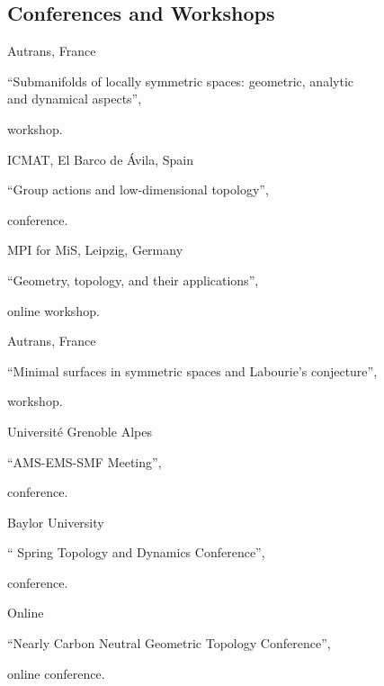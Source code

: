 
\subsection{Conferences and Workshops}

{Autrans, France}
{``Submanifolds of locally symmetric spaces: geometric, analytic \\and dynamical aspects'', \begin{footnotesize}
		workshop.
\end{footnotesize}}
{}


{ICMAT, El Barco de {\'A}vila, Spain}
{``Group actions and low-dimensional topology'', \begin{footnotesize}
		conference.
	\end{footnotesize}}
{}

{MPI for MiS, Leipzig, Germany}
{``Geometry, topology, and their applications'', \begin{footnotesize}
		online workshop.
\end{footnotesize}}
{}

{Autrans, France}
{``Minimal surfaces in symmetric spaces and Labourie's conjecture'', \begin{footnotesize}
		workshop.
	\end{footnotesize}}
{}

{Universit\'e Grenoble Alpes}
{``AMS-EMS-SMF Meeting'', \begin{footnotesize}
		conference.
	\end{footnotesize}}
{}

{Baylor University}
{`` Spring Topology and Dynamics Conference'', \begin{footnotesize}
		conference.
	\end{footnotesize}}
{}

{Online}
{``Nearly Carbon Neutral Geometric Topology Conference'', \begin{footnotesize}
		online conference.
	\end{footnotesize}}
{}

